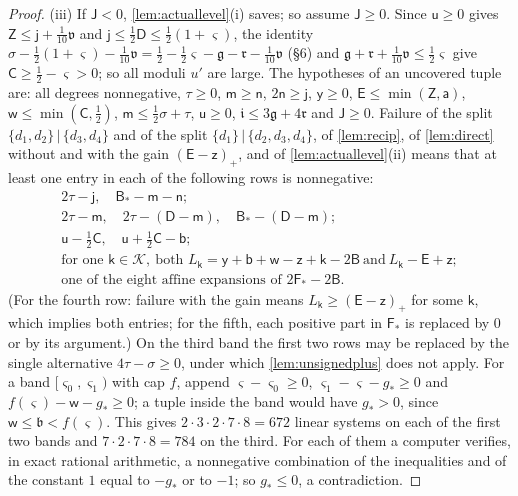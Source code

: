 \documentclass[11pt,colorlinks]{charlie}
\begin{document}
\begin{proof}
(iii) If $\mathsf J<0$, \cref{lem:actuallevel}(i) saves; so assume $\mathsf J\ge0$. Since $\mathsf u\ge0$ gives $\mathsf Z\le\mathsf j+\frac1{10}\mathfrak v$ and $\mathsf j\le\frac12\mathsf D\le\frac12(1+\varsigma)$, the identity $\sigma-\frac12(1+\varsigma)-\frac1{10}\mathfrak v=\frac12-\frac12\varsigma-\mathfrak g-\mathfrak r-\frac1{10}\mathfrak v$ (\S6) and $\mathfrak g+\mathfrak r+\frac1{10}\mathfrak v\le\frac12\varsigma$ give $\mathsf C\ge\frac12-\varsigma>0$; so all moduli $u'$ are large. The hypotheses of an uncovered tuple are: all degrees nonnegative, $\tau\ge0$, $\mathsf m\ge\mathsf n$, $2\mathsf n\ge\mathsf j$, $\mathsf y\ge0$, $\mathsf E\le\min(\mathsf Z,\mathsf a)$, $\mathsf w\le\min(\mathsf C,\frac12)$, $\mathsf m\le\frac12\sigma+\tau$, $\mathsf u\ge0$, $\mathfrak i\le3\mathfrak g+4\mathfrak r$ and $\mathsf J\ge0$. Failure of the split $\{d_1,d_2\}\,|\,\{d_3,d_4\}$ and of the split $\{d_1\}\,|\,\{d_2,d_3,d_4\}$, of \cref{lem:recip}, of \cref{lem:direct} without and with the gain $(\mathsf E-\mathsf z)_+$, and of \cref{lem:actuallevel}(ii) means that at least one entry in each of the following rows is nonnegative:
\begin{equation}\label{eq:rows}
 \begin{array}{l}
 2\tau-\mathsf j,\quad \mathsf B_*-\mathsf m-\mathsf n;\\
 2\tau-\mathsf m,\quad 2\tau-(\mathsf D-\mathsf m),\quad \mathsf B_*-(\mathsf D-\mathsf m);\\
 \mathsf u-\tfrac12\mathsf C,\quad \mathsf u+\tfrac12\mathsf C-\mathsf b;\\
 \text{for one }\mathsf k\in\mathcal K,\ \text{both }L_{\mathsf k}=\mathsf y+\mathsf b+\mathsf w-\mathsf z+\mathsf k-2\mathsf B\ \text{and}\ L_{\mathsf k}-\mathsf E+\mathsf z;\\
 \text{one of the eight affine expansions of }2\mathsf F_*-2\mathsf B .
 \end{array}
\end{equation}
(For the fourth row: failure with the gain means $L_{\mathsf k}\ge(\mathsf E-\mathsf z)_+$ for some $\mathsf k$, which implies both entries; for the fifth, each positive part in $\mathsf F_*$ is replaced by $0$ or by its argument.) On the third band the first two rows may be replaced by the single alternative $4\tau-\sigma\ge0$, under which \cref{lem:unsignedplus} does not apply. For a band $[\varsigma_0,\varsigma_1)$ with cap $f$, append $\varsigma-\varsigma_0\ge0$, $\varsigma_1-\varsigma-g_*\ge0$ and $f(\varsigma)-\mathsf w-g_*\ge0$; a tuple inside the band would have $g_*>0$, since $\mathsf w\le\mathfrak b<f(\varsigma)$. This gives $2\cdot3\cdot2\cdot7\cdot8=672$ linear systems on each of the first two bands and $7\cdot2\cdot7\cdot8=784$ on the third. For each of them a computer verifies, in exact rational arithmetic, a nonnegative combination of the inequalities and of the constant $1$ equal to $-g_*$ or to $-1$; so $g_*\le0$, a contradiction.
\end{proof}
\end{document}
